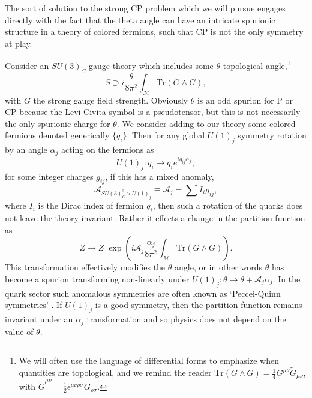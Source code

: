\documentclass[11pt,a4paper]{article}
\begin{document}
The sort of solution to the strong CP problem which we will pursue engages directly with the fact that the theta angle can have an intricate spurionic structure in a theory of colored fermions, such that CP is not the only symmetry at play.

Consider an $SU(3)_C$ gauge theory which includes some $\theta$ topological angle,\footnote{We will often use the language of differential forms to emphasize when quantities are topological, and we remind the reader $\text{Tr} \left(G \wedge G\right) = \frac{1}{4} G^{\mu \nu} \tilde{G}_{\mu \nu}$, with $\tilde{G}^{\mu\nu} = \frac{1}{2} \epsilon^{\mu\nu\rho\sigma} G_{\rho\sigma}$.}
\begin{equation}
    S \supset i \frac{\theta}{8\pi^2}  \int_{\mathcal{M}} \text{Tr} \left(G \wedge G\right),
\end{equation}
with $G$ the strong gauge field strength. Obviously $\theta$ is an odd spurion for P or CP because the Levi-Civita symbol is a pseudotensor, but this is not necessarily the only spurionic charge for $\theta$.
We consider adding to our theory some colored fermions denoted generically $\lbrace q_i \rbrace$. Then for any global $U(1)_j$ symmetry rotation by an angle $\alpha_j$ acting on the fermions as
\begin{equation}
    U(1)_j: q_i \rightarrow q_i e^{i g_{ij} \alpha_j},
\end{equation}
for some integer charges $g_{ij}$, if this has a mixed anomaly,
\begin{equation}
    \mathcal{A}_{SU(3)^2_C \times U(1)_j}\equiv \mathcal{A}_j = \sum I_{i} g_{ij},
\end{equation}
where $I_i$ is the Dirac index of fermion $q_i$, then such a rotation of the quarks does not leave the theory invariant. Rather it effects a change in the partition function as
\begin{equation}
    Z \rightarrow Z \; \exp{\left( i \mathcal{A}_j \frac{\alpha_j}{8
    \pi^2} \int_{\mathcal{M}} \text{Tr} \left(G \wedge G\right) \right)}.
\end{equation}
This transformation effectively modifies the $\theta$ angle, or in other words $\theta$ has become a spurion transforming non-linearly under $U(1)_j: \theta \rightarrow \theta + \mathcal{A}_j \alpha_j$. In the quark sector such anomalous symmetries are often known as `Peccei-Quinn symmetries' \cite{Peccei:1977hh,Peccei:1977ur}. 
If $U(1)_j$ is a good symmetry, then the partition function remains invariant under an $\alpha_j$ transformation and so physics does not depend on the value of $\theta$. 
\end{document}
